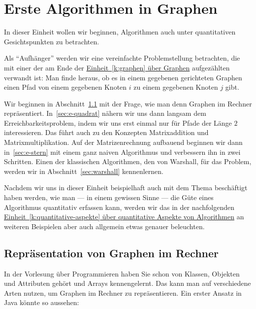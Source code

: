 \Tut\chapter{Erste Algorithmen in Graphen}
\label{k:alg-graphen}

In dieser Einheit wollen wir beginnen, Algorithmen auch unter
quantitativen Gesichtspunkten zu betrachten. 

Als "`Aufhänger"' werden wir eine vereinfachte Problemstellung
betrachten, die mit einer der am Ende der
\hyperref[k:graphen]{Einheit~\ref{k:graphen} über Graphen}
aufgezählten verwandt ist: Man finde heraus, ob es in einem gegebenen
gerichteten Graphen einen Pfad von einem gegebenen Knoten $i$ zu einem
gegebenen Knoten $j$ gibt.

Wir beginnen in Abschnitt~\ref{sec:graph-in-rechner} mit der Frage,
wie man denn Graphen im Rechner repräsentiert. In~\ref{sec:e-quadrat}
nähern wir uns dann langsam dem Erreichbarkeitsproblem, indem wir uns
erst einmal nur für Pfade der Länge $2$ interessieren. Das führt auch
zu den Konzepten Matrixaddition und Matrixmultiplikation.  Auf der
Matrizenrechnung aufbauend beginnen wir dann in~\ref{sec:e-stern} mit
einem ganz naiven Algorithmus und verbessern ihn in zwei Schritten.
Einen der klassischen Algorithmen, den von Warshall, für das Problem,
werden wir in Abschnitt~\ref{sec:warshall} kennenlernen.

Nachdem wir uns in dieser Einheit beispielhaft auch mit dem Thema
beschäftigt haben werden, wie man --- in einem gewissen Sinne --- die
Güte eines Algorithmus quantitativ erfassen kann, werden wir das in
der nachfolgenden
\hyperref[k:quantitative-aspekte]{Einheit~\ref{k:quantitative-aspekte}
  über quantitative Aspekte von Algorithmen} an weiteren Beispielen
aber auch allgemein etwas genauer beleuchten.

\Tut\section{Repr\"asentation von Graphen im Rechner}
\label{sec:graph-in-rechner}

In der Vorlesung über Programmieren haben Sie schon von Klassen,
Objekten und Attributen gehört und Arrays kennengelernt. Das kann man
auf verschiedene Arten nutzen, um \zB Graphen im Rechner zu
repräsentieren. Ein erster Ansatz in Java könnte \zB so aussehen:

